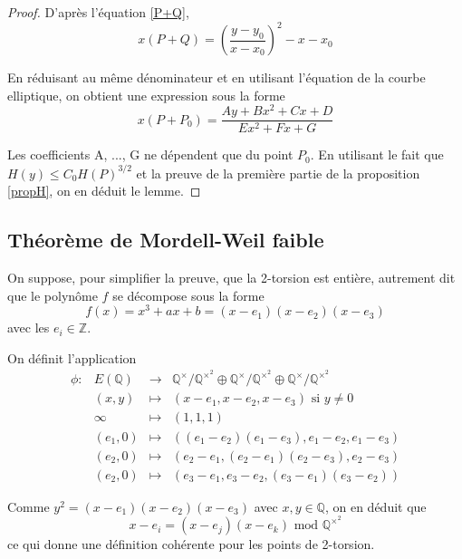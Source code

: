 \documentclass{article}
\begin{document}
\begin{proof}
D'après l'équation \ref{P+Q},
\begin{equation*}
x(P+Q) = (\frac{y - y_{0}}{x - x_{0}})^2 - x - x_{0}
\end{equation*}

En réduisant au même dénominateur et en utilisant l'équation de la courbe elliptique,
on obtient une expression sous la forme
\begin{equation*}
x(P+P_{0}) = \frac{Ay + Bx^2 + Cx + D}{Ex^2 + Fx + G}
\end{equation*}

Les coefficients A, ..., G ne dépendent que du point $P_{0}$. En utilisant le fait que
$H(y)\leq C_{0}H(P)^{3/2}$ et la preuve de la première partie de la
proposition \ref{propH}, on en déduit le lemme.
\end{proof}

\subsection{Théorème de Mordell-Weil faible}
On suppose, pour simplifier la preuve, que la 2-torsion est entière, autrement dit que le polynôme $f$ se décompose sous la forme
\begin{equation*}
f(x)= x^3 + ax + b = (x-e_{1})(x-e_{2})(x-e_{3})
\end{equation*}
avec les $e_{i} \in \mathbb{Z}$.

On définit l'application 
\begin{equation*}
\begin{array}{lrcl}
\phi :&E(\mathbb{Q}) & \longrightarrow & \mathbb{Q}^{\times}/\mathbb{Q}^{\times^2}
\oplus \mathbb{Q}^{\times}/\mathbb{Q}^{\times^2} \oplus \mathbb{Q}^{\times}/\mathbb{Q}^{\times^2} \\
	 & (x,y) & \longmapsto & (x-e_{1}, x-e_{2}, x-e_{3}) \text{ si } y \neq 0 \\
	 & \infty & \longmapsto & (1, 1, 1) \\
	 & (e_{1}, 0) & \longmapsto & ((e_{1} - e_{2})(e_{1} - e_{3}), e_{1} - e_{2}, e_{1} - e_{3})\\
	 & (e_{2}, 0) & \longmapsto & (e_{2} - e_{1}, (e_{2} - e_{1})(e_{2} - e_{3}), e_{2} - e_{3})\\
	 & (e_{2}, 0) & \longmapsto & (e_{3} - e_{1}, e_{3} - e_{2}, (e_{3} - e_{1})(e_{3} - e_{2}))
\end{array}
\end{equation*}

Comme $y^2 = (x-e_{1})(x-e_{2})(x-e_{3})$ avec $x, y \in \mathbb{Q}$, on en déduit que 
\begin{equation*}
x-e_{i} = (x-e_{j})(x-e_{k}) \text{ mod } \mathbb{Q}^{\times^2}
\end{equation*}
ce qui donne une définition cohérente pour les points de 2-torsion.
\end{document}
